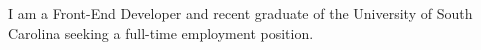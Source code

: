 \begin{flushleft}
I am a Front-End Developer and recent graduate of the University of South Carolina seeking a full-time employment position.
\end{flushleft}